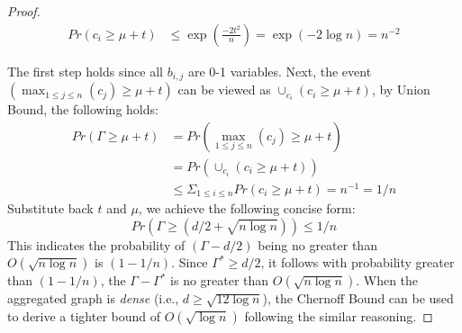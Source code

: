 \begin{proof}
\begin{equation*}
\begin{split}
	Pr(c_i \geq \mu + t) &\leq \exp(\frac{-2t^2}{n}) = \exp(-2\log n) = n^{-2}
\end{split}
\end{equation*}

The first step holds since all $b_{i,j}$ are 0-1 variables. 
Next, the event $(\max_{1 \leq j \leq n}(c_j) \geq \mu + t)$ can be viewed as
$\cup_{c_i} (c_i \geq \mu + t )$, by Union Bound, the following holds:
\begin{equation*}
\begin{split}
	Pr(\Gamma \geq \mu + t) &=Pr(\max_{1\leq j \leq n}(c_j) \geq \mu + t)  \\
		& = Pr(\cup_{c_i} (c_i \geq \mu + t )) \\
		&\leq \Sigma_{1 \leq i \leq n} Pr(c_i \geq \mu + t) = n^{-1} = 1/n
\end{split}
\end{equation*}
Substitute back $t$ and $\mu$, we achieve the following concise form:
\begin{equation*}
	Pr(\Gamma \geq (d/2 + \sqrt{n\log n})) \leq 1/n
\end{equation*}
This indicates the probability of $(\Gamma-d/2)$ being no greater than $ O(\sqrt{n\log n})$ is $(1-1/n)$. 
Since $\Gamma^* \geq d/2$, it follows with probability greater than $(1-1/n)$, 
the $\Gamma - \Gamma^*$ is no greater than $O(\sqrt{n\log n})$.
When the aggregated graph is \emph{dense} (i.e., $d\geq \sqrt{12 \log n}$),
the Chernoff Bound can be used to derive a tighter bound of 
$O(\sqrt{\log n}) $ following the similar reasoning.
\end{proof}


